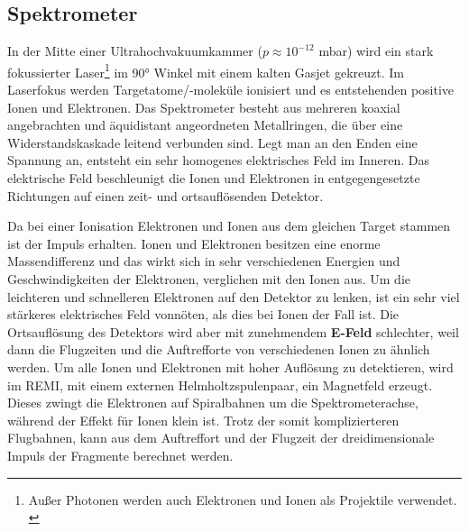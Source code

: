 \subsection{Spektrometer} \label{sec:Spektrometer} 

In der Mitte einer Ultrahochvakuumkammer ($p \approx 10^{-12}$ mbar) wird ein stark fokussierter Laser\footnote{Außer Photonen werden auch Elektronen und Ionen als Projektile verwendet. \cite{ullrich2003}} im 90° Winkel mit einem kalten Gasjet gekreuzt. Im Laserfokus werden Targetatome/-moleküle ionisiert und es entstehenden positive Ionen und Elektronen.
%
Das Spektrometer besteht aus mehreren koaxial angebrachten und äquidistant angeordneten Metallringen, die über eine Widerstandskaskade leitend verbunden sind. Legt man an den Enden eine Spannung an, entsteht ein sehr homogenes elektrisches Feld im Inneren. Das elektrische Feld beschleunigt die Ionen und Elektronen in entgegengesetzte Richtungen auf einen zeit- und ortsauflösenden Detektor. 
%
%
%

Da bei einer Ionisation Elektronen und Ionen aus dem gleichen Target stammen ist der Impuls erhalten. Ionen und Elektronen besitzen eine enorme Massendifferenz %
und das wirkt sich in sehr verschiedenen Energien und Geschwindigkeiten der Elektronen, verglichen mit den Ionen aus. Um die leichteren und schnelleren Elektronen auf den Detektor zu lenken, ist  ein sehr viel stärkeres elektrisches Feld vonnöten, als dies bei Ionen der Fall ist. Die Ortsauflösung des Detektors wird aber mit zunehmendem \textbf{E-Feld} schlechter, weil dann die Flugzeiten und die Auftrefforte von verschiedenen Ionen zu ähnlich werden.
Um alle Ionen und Elektronen mit hoher Auflösung zu detektieren, wird im REMI, mit einem externen Helmholtzspulenpaar, ein Magnetfeld erzeugt. Dieses zwingt die Elektronen auf Spiralbahnen um die Spektrometerachse, während der Effekt für Ionen klein ist. Trotz der somit komplizierteren Flugbahnen, kann aus dem Auftreffort und der Flugzeit der dreidimensionale Impuls der Fragmente berechnet werden. 

